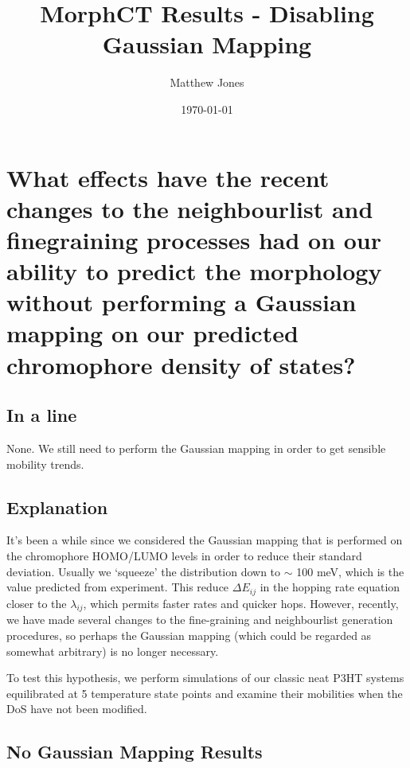 \documentclass[12pt]{article}
\title{MorphCT Results - Disabling Gaussian Mapping}
\author{Matthew Jones}
\date{\today}
\begin{document}
\maketitle


\section{What effects have the recent changes to the neighbourlist and finegraining processes had on our ability to predict the morphology without performing a Gaussian mapping on our predicted chromophore density of states?}


\subsection{In a line}

None.
We still need to perform the Gaussian mapping in order to get sensible mobility trends.


\subsection{Explanation}


It's been a while since we considered the Gaussian mapping that is performed on the chromophore HOMO/LUMO levels in order to reduce their standard deviation.
Usually we `squeeze' the distribution down to $\sim$ 100 meV, which is the value predicted from experiment.
This reduce $\Delta E_{ij}$ in the hopping rate equation closer to the $\lambda_{ij}$, which permits faster rates and quicker hops.
However, recently, we have made several changes to the fine-graining and neighbourlist generation procedures, so perhaps the Gaussian mapping (which could be regarded as somewhat arbitrary) is no longer necessary.

To test this hypothesis, we perform simulations of our classic neat P3HT systems equilibrated at 5 temperature state points and examine their mobilities when the DoS have not been modified.

\clearpage

\subsection{No Gaussian Mapping Results}
\end{document}
